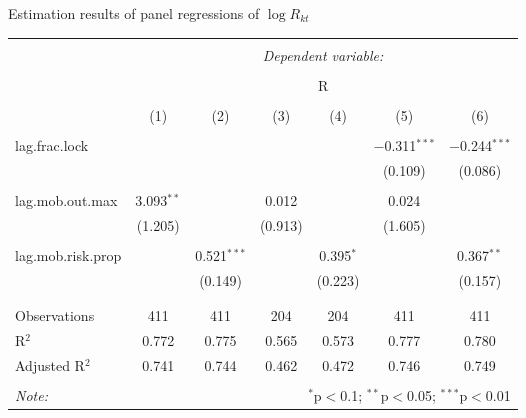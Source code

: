   \caption{Estimation results of panel regressions of $\log R_{kt}$} 
  \label{} 
\small 
\begin{tabular}{@{\extracolsep{5pt}}lcccccc} 
\\[-1.8ex]\hline 
\hline \\[-1.8ex] 
 & \multicolumn{6}{c}{\textit{Dependent variable:}} \\ 
\cline{2-7} 
\\[-1.8ex] & \multicolumn{6}{c}{R} \\ 
\\[-1.8ex] & (1) & (2) & (3) & (4) & (5) & (6)\\ 
\hline \\[-1.8ex] 
 lag.frac.lock &  &  &  &  & $-$0.311$^{***}$ & $-$0.244$^{***}$ \\ 
  &  &  &  &  & (0.109) & (0.086) \\ 
  & & & & & & \\ 
 lag.mob.out.max & 3.093$^{**}$ &  & 0.012 &  & 0.024 &  \\ 
  & (1.205) &  & (0.913) &  & (1.605) &  \\ 
  & & & & & & \\ 
 lag.mob.risk.prop &  & 0.521$^{***}$ &  & 0.395$^{*}$ &  & 0.367$^{**}$ \\ 
  &  & (0.149) &  & (0.223) &  & (0.157) \\ 
  & & & & & & \\ 
\hline \\[-1.8ex] 
Observations & 411 & 411 & 204 & 204 & 411 & 411 \\ 
R$^{2}$ & 0.772 & 0.775 & 0.565 & 0.573 & 0.777 & 0.780 \\ 
Adjusted R$^{2}$ & 0.741 & 0.744 & 0.462 & 0.472 & 0.746 & 0.749 \\ 
\hline 
\hline \\[-1.8ex] 
\textit{Note:}  & \multicolumn{6}{r}{$^{*}$p$<$0.1; $^{**}$p$<$0.05; $^{***}$p$<$0.01} \\ 
\end{tabular} 
